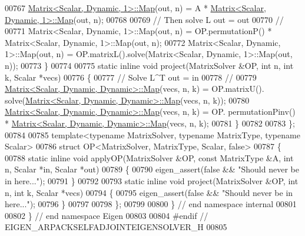 \begin{DoxyCode}
00767     \hyperlink{group___core___module_class_eigen_1_1_matrix}{Matrix<Scalar, Dynamic, 1>::Map}(out, n) = A * 
      \hyperlink{group___core___module_class_eigen_1_1_matrix}{Matrix<Scalar, Dynamic, 1>::Map}(out, n);
00768 
00769     \textcolor{comment}{// Then solve L out = out}
00770     \textcolor{comment}{//}
00771     Matrix<Scalar, Dynamic, 1>::Map(out, n) = OP.permutationP() * Matrix<Scalar, Dynamic, 1>::Map(out, n);
00772     Matrix<Scalar, Dynamic, 1>::Map(out, n) = OP.matrixL().solve(Matrix<Scalar, Dynamic, 1>::Map(out, n));
00773 \}
00774 
00775   \textcolor{keyword}{static} \textcolor{keyword}{inline} \textcolor{keywordtype}{void} project(MatrixSolver &OP, \textcolor{keywordtype}{int} n, \textcolor{keywordtype}{int} k, Scalar *vecs)
00776 \{
00777     \textcolor{comment}{// Solve L^T out = in}
00778     \textcolor{comment}{//}
00779     \hyperlink{group___core___module_class_eigen_1_1_matrix}{Matrix<Scalar, Dynamic, Dynamic>::Map}(vecs, n, k) = OP.matrixU().
      solve(\hyperlink{group___core___module_class_eigen_1_1_matrix}{Matrix<Scalar, Dynamic, Dynamic>::Map}(vecs, n, k));
00780     \hyperlink{group___core___module_class_eigen_1_1_matrix}{Matrix<Scalar, Dynamic, Dynamic>::Map}(vecs, n, k) = OP.
      permutationPinv() * \hyperlink{group___core___module_class_eigen_1_1_matrix}{Matrix<Scalar, Dynamic, Dynamic>::Map}(vecs, n, k);
00781 \}
00782 
00783 \};
00784 
00785 \textcolor{keyword}{template}<\textcolor{keyword}{typename} MatrixSolver, \textcolor{keyword}{typename} MatrixType, \textcolor{keyword}{typename} Scalar>
00786 \textcolor{keyword}{struct }OP<MatrixSolver, MatrixType, Scalar, false>
00787 \{
00788   \textcolor{keyword}{static} \textcolor{keyword}{inline} \textcolor{keywordtype}{void} applyOP(MatrixSolver &OP, \textcolor{keyword}{const} MatrixType &A, \textcolor{keywordtype}{int} n, Scalar *in, Scalar *out)
00789 \{
00790     eigen\_assert(\textcolor{keyword}{false} && \textcolor{stringliteral}{"Should never be in here..."});
00791 \}
00792 
00793   \textcolor{keyword}{static} \textcolor{keyword}{inline} \textcolor{keywordtype}{void} project(MatrixSolver &OP, \textcolor{keywordtype}{int} n, \textcolor{keywordtype}{int} k, Scalar *vecs)
00794 \{
00795     eigen\_assert(\textcolor{keyword}{false} && \textcolor{stringliteral}{"Should never be in here..."});
00796 \}
00797 
00798 \};
00799 
00800 \} \textcolor{comment}{// end namespace internal}
00801 
00802 \} \textcolor{comment}{// end namespace Eigen}
00803 
00804 \textcolor{preprocessor}{#endif // EIGEN\_ARPACKSELFADJOINTEIGENSOLVER\_H}
00805 
\end{DoxyCode}
